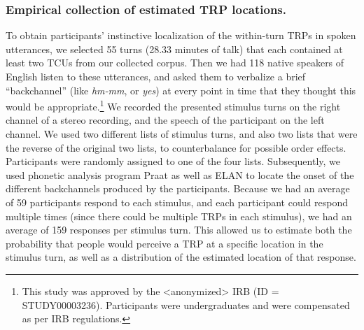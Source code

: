 \subsubsection{Empirical collection of estimated TRP locations.}
\label{sec:trpCollection}

To obtain participants' instinctive localization of the within-turn TRPs in spoken utterances, we selected 55 turns (28.33 minutes of talk) that each contained at least two TCUs from our collected corpus. Then we had 118 native speakers of English listen to these utterances, and asked them to verbalize a brief ``backchannel'' (like \textit{hm-mm}, or \textit{yes}) at every point in time that they thought this would be appropriate.\footnote{This study was approved by the <anonymized> IRB (ID = STUDY00003236). Participants were undergraduates and were compensated as per IRB regulations.} We recorded the presented stimulus turns on the right channel of a stereo recording, and the speech of the participant on the left channel. We used two different lists of stimulus turns, and also two lists that were the reverse of the original two lists, to counterbalance for possible order effects. Participants were randomly assigned to one of the four lists. Subsequently, we used phonetic analysis program Praat \cite{boersma2001speak} as well as ELAN \cite{wittenburg-etal-2006-elan} to locate the onset of the different backchannels produced by the participants. Because we had an average of 59 participants respond to each stimulus, and each participant could respond multiple times (since there could be multiple TRPs in each stimulus), we had an average of 159 responses per stimulus turn. This allowed us to estimate both the probability that people would perceive a TRP at a specific location in the stimulus turn, as well as a distribution of the estimated location of that response.

